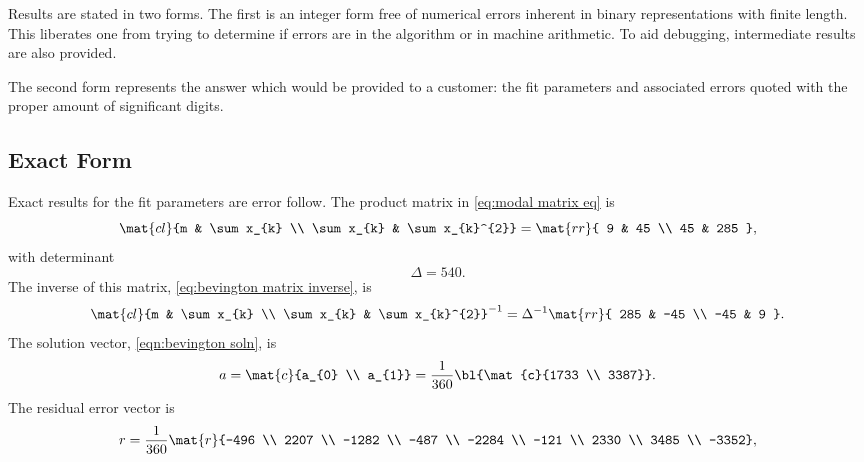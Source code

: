 Results are stated in two forms. The first is an integer form free of numerical errors inherent in binary representations with finite length. This liberates one from trying to determine if errors are in the algorithm or in machine arithmetic. To aid debugging, intermediate results are also provided.

The second form represents the answer which would be provided to a customer: the fit parameters and associated errors quoted with the proper amount of significant digits.
 
\subsection{\label{sec:exact form}Exact Form}  %
Exact results for the fit parameters are error follow. The product matrix in \eqref{eq:modal matrix eq} is 
  \begin{equation*}   %
    \mat{cl}{m & \sum x_{k} \\ \sum x_{k} & \sum x_{k}^{2}} = \mat{rr}{ 9 & 45 \\ 45 & 285 },
  \end{equation*}
with determinant
  \begin{equation*}   %
    \Delta =  540.
  \end{equation*}
The inverse of this matrix, \eqref{eq:bevington matrix inverse}, is
  \begin{equation*}   %
    \mat{cl}{m & \sum x_{k} \\ \sum x_{k} & \sum x_{k}^{2}} ^{-1} = \Delta^{-1} \mat{rr}{ 285 & -45 \\ -45 & 9 }.
  \end{equation*}
The solution vector, \eqref{eqn:bevington soln}, is
  \begin{equation*}   %
      a = \mat{c}{a_{0} \\ a_{1}} = \frac{1}{360} \bl{\mat{c}{1733 \\ 3387}}.
  \end{equation*}
The residual error vector is 
  \begin{equation*}
        r = \frac{1}{360}
          \mat{r}{-496 \\ 2207 \\ -1282 \\ -487 \\ -2284 \\ -121 \\ 2330 \\ 3485 \\ -3352},
  \end{equation*}

